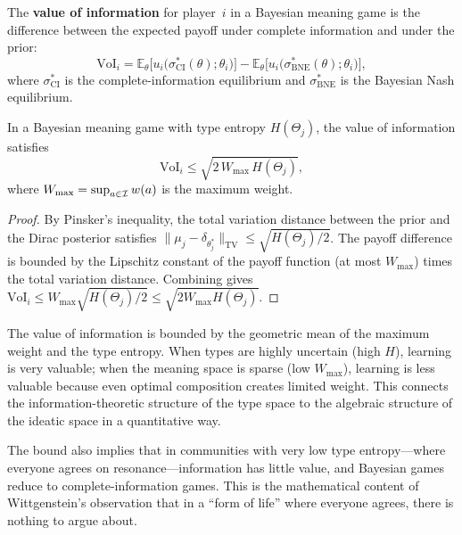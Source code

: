 \begin{definition}
\label{def:voi}
The \textbf{value of information} for player~$i$ in a Bayesian
meaning game is the difference between the expected payoff under
complete information and under the prior:
\[
  \mathrm{VoI}_i
  = \mathbb{E}_\theta\bigl[u_i\bigl(\sigma^*_{\mathrm{CI}}(\theta);\theta_i\bigr)\bigr]
  - \mathbb{E}_\theta\bigl[u_i\bigl(\sigma^*_{\mathrm{BNE}}(\theta);\theta_i\bigr)\bigr],
\]
where $\sigma^*_{\mathrm{CI}}$ is the complete-information equilibrium
and $\sigma^*_{\mathrm{BNE}}$ is the Bayesian Nash equilibrium.
\end{definition}

\begin{theorem}
\label{thm:voi-bound}
In a Bayesian meaning game with type entropy $H(\Theta_j)$, the
value of information satisfies
\[
  \mathrm{VoI}_i
  \le \sqrt{2\, W_{\max}\, H(\Theta_j)},
\]
where $W_{\max} = \sup_{a \in \mathcal{I}} w(a)$ is the maximum weight.
\end{theorem}

\begin{proof}
By Pinsker's inequality, the total variation distance between the
prior and the Dirac posterior satisfies
$\| \mu_j - \delta_{\theta_j^*}\|_{\mathrm{TV}} \le \sqrt{H(\Theta_j)/2}$.
The payoff difference is bounded by the Lipschitz constant of the
payoff function (at most $W_{\max}$) times the total variation
distance.  Combining gives $\mathrm{VoI}_i \le W_{\max}
\sqrt{H(\Theta_j)/2} \le \sqrt{2 W_{\max} H(\Theta_j)}$.
\end{proof}

\begin{interpretation}
The value of information is bounded by the geometric mean of the
maximum weight and the type entropy.  When types are highly uncertain
(high $H$), learning is very valuable; when the meaning space is
sparse (low $W_{\max}$), learning is less valuable because even
optimal composition creates limited weight.  This connects the
information-theoretic structure of the type space to the algebraic
structure of the ideatic space in a quantitative way.

The bound also implies that in communities with very low type entropy---where
everyone agrees on resonance---information has little value, and
Bayesian games reduce to complete-information games.  This is the
mathematical content of Wittgenstein's observation that in a
``form of life'' where everyone agrees, there is nothing to argue about.
\end{interpretation}



